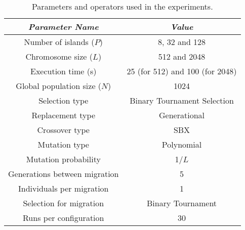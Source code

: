 \documentclass[Afour,sageh,times]{sagej}
\begin{document}






\begin{table*}
\begin{center}
\begin{tabular}{|c|c|}
\hline
{\em Parameter Name} & {\em Value} \\ \hline
Number of islands ($P$) & 8, 32 and 128 \\ \hline
Chromosome size ($L$) & 512 and 2048 \\ \hline
Execution time (s) & 25 (for 512) and 100 (for 2048) \\ \hline \hline
Global population size ($N$) & 1024 \\ \hline
Selection type & Binary Tournament Selection \\ \hline
Replacement type & Generational \\ \hline 
Crossover type & SBX \\ \hline
Mutation  type & Polynomial\\ \hline
Mutation probability & 1/$L$ \\ \hline
Generations between migration & 5 \\ \hline
Individuals per migration & 1 \\ \hline
Selection for migration & Binary Tournament\\ \hline
Runs per configuration & 30 \\ \hline
\end{tabular}
\caption{Parameters and operators used in the experiments.}
\label{tab:parameters}
\end{center}
\end{table*}
\end{document}
